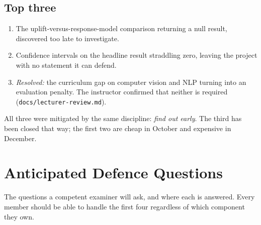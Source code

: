 \documentclass[11pt,a4paper]{article}
\begin{document}
\subsection{Top three}

\begin{enumerate}
\item The uplift-versus-response-model comparison returning a null result, discovered too late to
investigate.
\item Confidence intervals on the headline result straddling zero, leaving the project with no
statement it can defend.
\item \emph{Resolved:} the curriculum gap on computer vision and NLP turning into an evaluation
penalty. The instructor confirmed that neither is required (\texttt{docs/lecturer-review.md}).
\end{enumerate}

All three were mitigated by the same discipline: \emph{find out early}. The third has been closed
that way; the first two are cheap in October and expensive in December.

\section{Anticipated Defence Questions}
\label{sec:defence}

The questions a competent examiner will ask, and where each is answered. Every member should be
able to handle the first four regardless of which component they own.
\end{document}
